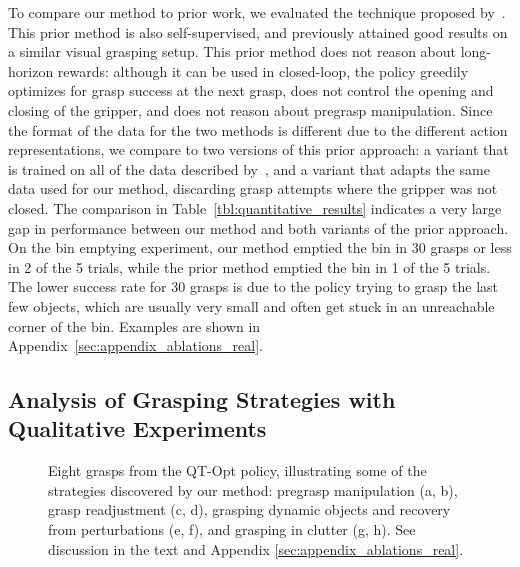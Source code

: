 \documentclass{article}
\begin{document}
To compare our method to prior work, we evaluated the technique proposed by~\citet{levine16}. This prior method is also self-supervised, and previously attained good results on a similar visual grasping setup. This prior method does not reason about long-horizon rewards: although it can be used in closed-loop, the policy greedily optimizes for grasp success at the next grasp, does not control the opening and closing of the gripper, and does not reason about pregrasp manipulation. Since the format of the data for the two methods is different due to the different action representations, we compare to two versions of this prior approach: a variant that is trained on all of the data described by~\citet{levine16}, and a variant that adapts the same data used for our method, discarding grasp attempts where the gripper was not closed. The comparison in Table~\ref{tbl:quantitative_results} indicates a very large gap in performance between our method and both variants of the prior approach. On the bin emptying experiment, our method emptied the bin in 30 grasps or less in 2 of the 5 trials, while the prior method emptied the bin in 1 of the 5 trials. The lower success rate for 30 grasps is due to the policy trying to grasp the last few objects, which are usually very small and often get stuck in an unreachable corner of the bin. Examples are shown in Appendix~\ref{sec:appendix_ablations_real}.



\vspace{-0.1in}
\subsection{Analysis of Grasping Strategies with Qualitative Experiments}
\vspace{-0.05in}
\label{sec:qualitative}

\begin{figure}
    \vspace{-0.05in}
    \centering
    \begin{imgrows}
        \imgrow {}
        \imgrow {}
        \imgrow {}
        \imgrow {}
        \imgrow {}
        \imgrow {}
        \imgrow {}
        \imgrow {}
    \end{imgrows}
    \caption{Eight grasps from the QT-Opt policy, illustrating some of the strategies discovered by our method: pregrasp manipulation (a, b), grasp readjustment (c, d), grasping dynamic objects and recovery from perturbations (e, f), and grasping in clutter (g, h). See discussion in the text and Appendix \ref{sec:appendix_ablations_real}.}
    \label{fig:qualitative}
    \vspace{-0.2in}
\end{figure}
\end{document}
